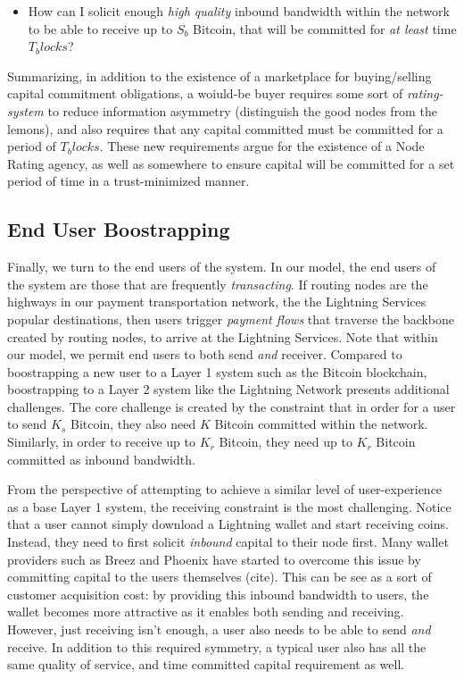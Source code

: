 \documentclass[12pt,a4paper]{article}
\theoremstyle{definition}
\begin{document}
\begin{itemize}
        \item How can I solicit enough \emph{high quality} inbound bandwidth
            within the network to be able to receive up to $S_b$ Bitcoin, that
            will be committed for \emph{at least} time $T_blocks$?
\end{itemize}

Summarizing, in addition to the existence of a marketplace for buying/selling
capital commitment obligations, a woiuld-be buyer requires some sort of
\emph{rating-system} to reduce information asymmetry (distinguish the good
nodes from the lemons), and also requires that any capital committed must be
committed for a period of $T_blocks$. These new requirements argue for the
existence of a Node Rating agency, as well as somewhere to ensure capital will
be committed for a set period of time in a trust-minimized manner.


\subsection{End User Boostrapping}

Finally, we turn to the end users of the system. In our model, the end users of
the system are those that are frequently \emph{transacting}. If routing nodes
are the highways in our payment transportation network, the the Lightning
Services popular destinations, then users trigger \emph{payment flows} that
traverse the backbone created by routing nodes, to arrive at the Lightning
Services. Note that within our model, we permit end users to both send
\emph{and} receiver. Compared to boostrapping a new user to a Layer 1 system
such as the Bitcoin blockchain, boostrapping to a Layer 2 system like the
Lightning Network presents additional challenges. The core challenge is created
by the constraint that in order for a user to send $K_s$ Bitcoin, they also
need $K$ Bitcoin committed within the network. Similarly, in order to receive
up to $K_r$ Bitcoin, they need up to $K_r$ Bitcoin committed as inbound
bandwidth.

From the perspective of attempting to achieve a similar level of
user-experience as a base Layer 1 system, the receiving constraint is the most
challenging. Notice that a user cannot simply download a Lightning wallet and
start receiving coins. Instead, they need to first solicit \emph{inbound}
capital to their node first. Many wallet providers such as Breez and Phoenix
have started to overcome this issue by committing capital to the users
themselves (cite). This can be see as a sort of customer acquisition cost: by
providing this inbound bandwidth to users, the wallet becomes more attractive
as it enables both sending and receiving. However, just receiving isn't enough,
a user also needs to be able to send \emph{and} receive. In addition to this
required symmetry, a typical user also has all the same quality of service, and
time committed capital requirement as well.
\end{document}
